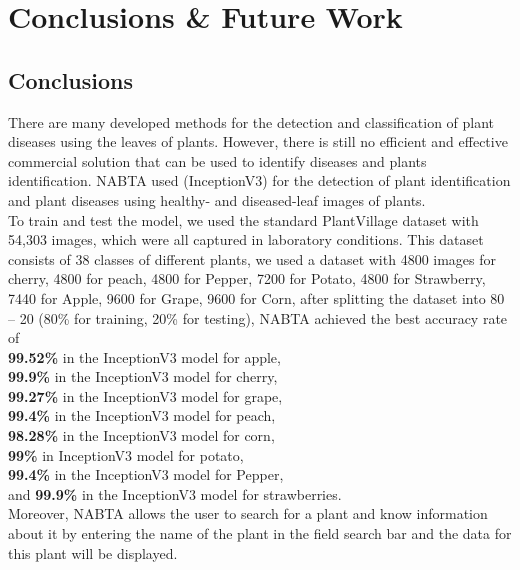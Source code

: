 \chapter{Conclusions \& Future Work}

\section{Conclusions}

There are many developed methods for the detection and classification 
of plant diseases using the leaves of plants. However, there is still 
no efficient and effective commercial solution that can be used to
identify diseases and plants identification. NABTA used (InceptionV3)
for the detection of plant identification and plant diseases using healthy- and
diseased-leaf images of plants. \\

To train and test the model, we used the standard PlantVillage dataset with
54,303 images, which were all captured in laboratory conditions. This dataset
consists of 38 classes of different plants, we used a dataset with 4800 images 
for cherry, 4800 for peach, 4800 for Pepper, 7200 for Potato, 4800 for Strawberry, 
7440 for Apple, 9600 for Grape, 9600 for Corn, after splitting the
dataset into 80 -- 20 (80\% for training, 20\% for testing),
NABTA achieved the best accuracy rate of \\[4pt]
\indent \textbf{99.52\%} in the InceptionV3 model for apple, \\[4pt]
\indent \textbf{99.9\%} in the InceptionV3 model for cherry, \\[4pt]
\indent \textbf{99.27\%} in the InceptionV3 model for grape, \\[4pt]
\indent \textbf{99.4\%} in the InceptionV3 model for peach, \\[4pt]
\indent \textbf{98.28\%} in the InceptionV3 model for corn, \\[4pt]
\indent \textbf{99\%} in InceptionV3 model for potato, \\[4pt]
\indent \textbf{99.4\%} in the InceptionV3 model for Pepper, \\[4pt]
\indent and \textbf{99.9\%} in the InceptionV3 model for strawberries. \\[4pt]
Moreover, NABTA allows the user to search for a plant and know information 
about it by entering the name of the plant in the field 
search bar and the data for this plant will be displayed. \\

